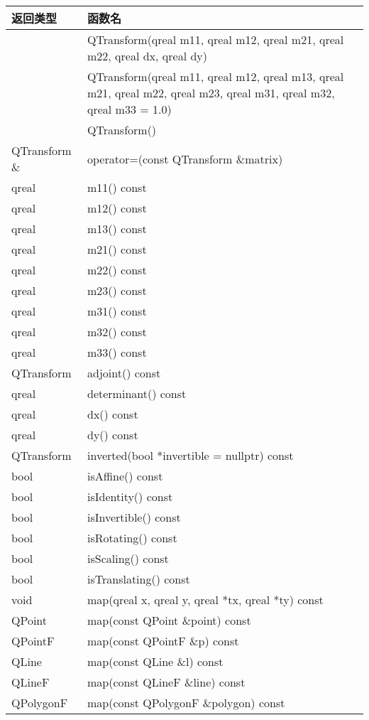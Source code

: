\begin{longtable}{|l|m{25em}|}
\hline
返回类型 	&函数名\\
\hline
	&QTransform(qreal m11, qreal m12, qreal m21, qreal m22, qreal dx, qreal dy)\\
	\hline
	&QTransform(qreal m11, qreal m12, qreal m13, qreal m21, qreal m22, qreal m23, qreal m31, qreal m32, qreal m33 = 1.0)\\
	\hline
	&QTransform()\\
	\hline
QTransform \& &	operator=(const QTransform \&matrix)\\
\hline
qreal &	m11() const\\
\hline
qreal &	m12() const\\
\hline
qreal &	m13() const\\
\hline
qreal &	m21() const\\
\hline
qreal &	m22() const\\
\hline
qreal &	m23() const\\
\hline
qreal &	m31() const\\
\hline
qreal &	m32() const\\
\hline
qreal &	m33() const\\
\hline
QTransform &	adjoint() const\\
\hline
qreal &	determinant() const\\
\hline
qreal &	dx() const\\
\hline
qreal &	dy() const\\
\hline
QTransform &	inverted(bool *invertible = nullptr) const\\
\hline
bool 	&isAffine() const\\
\hline
bool 	&isIdentity() const\\
\hline
bool &	isInvertible() const\\
\hline
bool &	isRotating() const\\
\hline
bool &	isScaling() const\\
\hline
bool 	&isTranslating() const\\
\hline
void &	map(qreal x, qreal y, qreal *tx, qreal *ty) const\\
\hline
QPoint &	map(const QPoint \&point) const\\
\hline
QPointF &	map(const QPointF \&p) const\\
\hline
QLine &	map(const QLine \&l) const\\
\hline
QLineF 	&map(const QLineF \&line) const\\
\hline
QPolygonF &	map(const QPolygonF \&polygon) const\\

\end{longtable}
